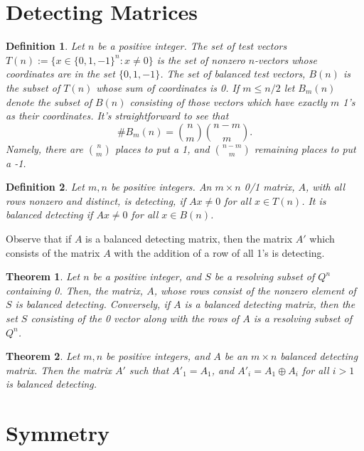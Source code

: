 \documentclass{article}
\newtheorem{definition}{Definition}
\newtheorem{theorem}{Theorem}
\begin{document}
\section{Detecting Matrices}
\label{sec:detecting}

\begin{definition}
  Let $n$ be a positive integer.  The set of \emph{test vectors}
  $T(n) := \{ x \in \{0,1,-1\}^n : x \ne 0\}$ is the set of nonzero $n$-vectors
whose coordinates are in the set $\{0,1,-1\}$.  The set of
\emph{balanced test vectors}, $B(n)$ is the subset of $T(n)$ whose sum
of coordinates is 0.  If $m \le n/2$ let $B_m(n)$ denote the subset of
$B(n)$ consisting of those vectors which have exactly $m$ 1's as their
coordinates.  It's straightforward to see that
\begin{displaymath}
  \# B_m(n) = \binom{n}{m} \binom{n-m}{m}.
\end{displaymath}
Namely, there are $\binom{n}{m}$ places to put a 1, and
$\binom{n-m}{m}$ remaining places to put a -1.
\end{definition}
\begin{definition}
\label{def:detecting}
  Let $m,n$ be positive integers.  An $m \times n$ 0/1 matrix, $A$,
  with all rows nonzero and distinct, is \emph{detecting}, if
  $Ax \ne 0$ for all $x \in T(n)$.  It is \emph{balanced detecting} if
  $Ax \ne 0$ for all $x \in B(n)$.
\end{definition}
Observe that if $A$ is a balanced detecting matrix, then the matrix
$A'$ which consists of the matrix $A$ with the addition of a row of
all 1's is detecting.
\begin{theorem}
  \label{thm:detecting}
  Let $n$ be a positive integer, and $S$ be a resolving subset of
  $Q^n$ containing 0. Then, the matrix, $A$, whose rows consist of the
  nonzero element of $S$ is balanced detecting.  Conversely, if $A$ is
  a balanced detecting matrix, then the set $S$ consisting of the 0
  vector along with the rows of $A$ is a resolving subset of $Q^n$.
\end{theorem}
\begin{theorem}
\label{thm:symmetry}
  Let $m,n$ be positive integers, and $A$ be an $m \times n$ balanced
  detecting matrix.  Then the matrix $A'$ such that $A'_1 = A_1$, and
  $A'_i = A_1 \oplus A_i$ for all $i > 1$ is balanced detecting.
\end{theorem}
\section{Symmetry}
\label{sec:symmetry}
\end{document}
